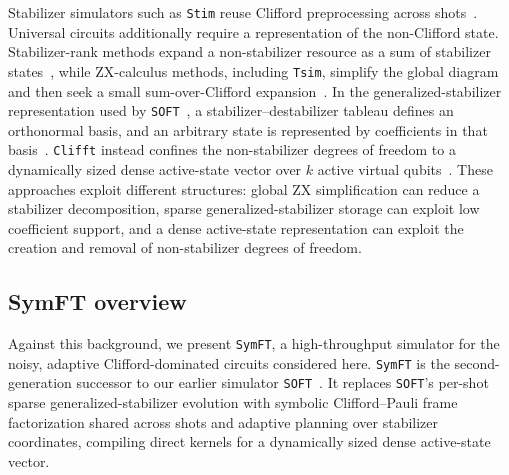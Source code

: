 \documentclass[a4paper,onecolumn,unpublished]{quantumarticle}
\newcommand{\tFont}[1]{\texttt{#1}}
\newcommand{\symft}{\tFont{SymFT}}
\newcommand{\soft}{\tFont{SOFT}}
\newcommand{\stim}{\tFont{Stim}}
\newcommand{\tsim}{\tFont{Tsim}}
\newcommand{\clifft}{\tFont{Clifft}}
\begin{document}
Stabilizer simulators such as \stim{} reuse Clifford preprocessing across shots~\cite{Gidney21}.
Universal circuits additionally require a representation of the non-Clifford state.
Stabilizer-rank methods expand a non-stabilizer resource as a sum of stabilizer states~\cite{BG16,BBC+19,QPG21}, while ZX-calculus methods, including \tsim{}, simplify the global diagram and then seek a small sum-over-Clifford expansion~\cite{KW22,KWV22,SK24,SK25,HLZ26}.
In the generalized-stabilizer representation used by \soft{}~\cite{LZZ+25}, a stabilizer--destabilizer tableau defines an orthonormal basis, and an arbitrary state is represented by coefficients in that basis~\cite{Yoder12}.
\clifft{} instead confines the non-stabilizer degrees of freedom to a dynamically sized dense active-state vector over $k$ active virtual qubits~\cite{CL26}.
These approaches exploit different structures: global ZX simplification can reduce a stabilizer decomposition, sparse generalized-stabilizer storage can exploit low coefficient support, and a dense active-state representation can exploit the creation and removal of non-stabilizer degrees of freedom.

\subsection{SymFT overview}
Against this background, we present \symft{}, a high-throughput simulator for the noisy, adaptive Clifford-dominated circuits considered here.
\symft{} is the second-generation successor to our earlier simulator \soft{}~\cite{LZZ+25}.
It replaces \soft{}'s per-shot sparse generalized-stabilizer evolution with symbolic Clifford--Pauli frame factorization shared across shots and adaptive planning over stabilizer coordinates, compiling direct kernels for a dynamically sized dense active-state vector.
\end{document}
